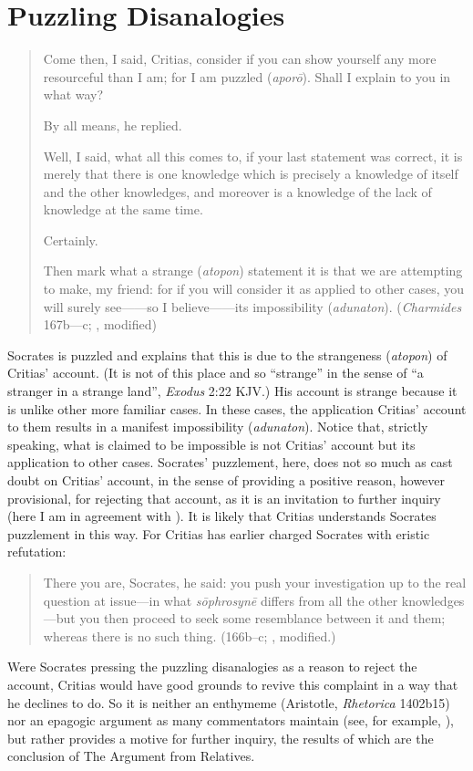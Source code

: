 
\section{Puzzling Disanalogies} %
\label{sec:puzzling_disanalogies}

\begin{quotation}
	Come then, I said, Critias, consider if you can show yourself any more resourceful than I am; for I am puzzled (\emph{aporō}). Shall I explain to you in what way?
	
	By all means, he replied.
	
	Well, I said, what all this comes to, if your last statement was correct, it is merely that there is one knowledge which is precisely a knowledge of itself and the other knowledges, and moreover is a knowledge of the lack of knowledge at the same time.
	
	Certainly.
	
	Then mark what a strange (\emph{atopon}) statement it is that we are attempting to make, my friend: for if you will consider it as applied to other cases, you will surely see——so I believe——its impossibility (\emph{adunaton}). (\emph{Charmides} 167b—c; \citealt[57]{Lamb:1927qw}, modified)
\end{quotation}

Socrates is puzzled and explains that this is due to the strangeness (\emph{atopon}) of  Critias' account. (It is not of this place and so ``strange'' in the sense of ``a stranger in a strange land'', \emph{Exodus} 2:22 KJV.) His account is strange because it is unlike other more familiar cases. In these cases, the application Critias' account to them results in a manifest impossibility (\emph{adunaton}). Notice that, strictly speaking, what is claimed to be impossible is not Critias' account but its application to other cases. Socrates' puzzlement, here, does not so much as cast doubt on Critias' account, in the sense of providing a positive reason, however provisional, for rejecting that account, as it is an invitation to further inquiry (here I am in agreement with \citealt{Politis:2008nv}). It is likely that Critias understands Socrates puzzlement in this way. For Critias has earlier charged Socrates with eristic refutation:
\begin{quote}
	There you are, Socrates, he said: you push your investigation up to the real question at issue—in what \emph{sōphrosynē} differs from all the other knowledges—but you then proceed to seek some resemblance between it and them; whereas there is no such thing. (166b–c; \citealt[53]{Lamb:1927qw}, modified.)
\end{quote}	
Were Socrates pressing the puzzling disanalogies as a reason to reject the account, Critias would have good grounds to revive this complaint in a way that he declines to do. So it is neither an enthymeme (Aristotle, \emph{Rhetorica} 1402b15) nor an epagogic argument as many commentators maintain (see, for example, \citealt[41]{Robinson:1941yb}), but rather provides a motive for further inquiry, the results of which are the conclusion of The Argument from Relatives.

